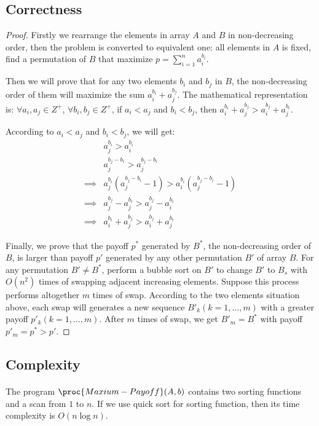 \documentclass[]{article}
\begin{document}
        \subsection{Correctness}
            \begin{proof}
            Firstly we rearrange the elements in array $A$ and $B$ in non-decreasing order, then the problem is converted to equivalent one: all elements in $A$ is fixed, find a permutation of $B$ that maximize $p = \sum_{i=1}^n a_i^{b_i}$.
            \item Then we will prove that for any two elements $b_i$ and $b_j$ in $B$, the non-decreasing order of them will maximize the sum $a_i^{b_i} + a_j^{b_j}$. The mathematical representation is: $\forall a_i,a_j \in Z^+$, $\forall b_i, b_j \in Z^+$, if $a_i<a_j$ and $b_i < b_j$, then $a_i^{b_i} + a_j^{b_j} > a_i^{b_j} + a_j^{b_i}$. 
            \item According to $a_i<a_j$ and $b_i < b_j$, we will get:
            \begin{align*}
            & a_j^{b_i} > a_i^{b_i} \\
            & a_j^{b_j-b_i} > a_j^{b_j-b_i} \\
    \implies& a_j^{b_i}(a_j^{b_j-b_i}-1) > a_i^{b_i}(a_j^{b_j-b_i}-1) \\
    \implies& a_j^{b_j}-a_j^{b_i} > a_j^{b_j}-a_i^{b_i} \\
    \implies& a_i^{b_i} + a_j^{b_j} > a_i^{b_j} + a_j^{b_i}
            \end{align*}
\item Finally, we prove that the payoff $p^*$ generated by $B^*$, the non-decreasing order of $B$, is larger than payoff $p'$ generated by any other permutation $B'$ of array $B$. For any permutation $B' \neq B^*$, perform a bubble sort on $B'$ to change $B'$ to $B_s$ with $O(n^2)$ times of swapping adjacent increasing elements. Suppose this process performs altogether $m$ times of swap. According to the two elements situation above, each swap will generates a new sequence $B'_k(k = 1,\dots,m)$ with a greater payoff $p'_k(k = 1,\dots,m)$. After $m$ times of swap, we get $B'_m = B^*$ with payoff $p'_m = p^* > p'$.
            \end{proof}   
        \subsection{Complexity}
            \paragraph{}The program $\proc{Maxium-Payoff}(A,b)$ contains two sorting functions and a scan from $1$ to $n$. If we use quick sort for sorting function, then its time complexity is $O(n\log n)$.
    
\end{document}
